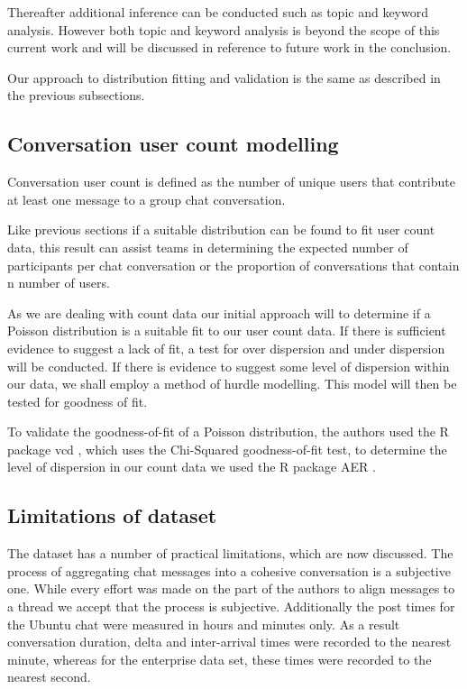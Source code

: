 \documentclass[conference]{IEEEtran}
\begin{document}
Thereafter additional inference can be conducted such as topic and keyword analysis. However both topic and keyword analysis is beyond the scope of this current work and will be discussed in reference to future work in the conclusion.

Our approach to distribution fitting and validation is the same as described in the previous subsections. 

\subsection{Conversation user count modelling}

Conversation user count is defined as the number of unique users that contribute at least one message to a group chat conversation. 

Like previous sections if a suitable distribution can be found to fit user count data, this result can assist teams in determining the expected number of participants per chat conversation or the proportion of conversations that contain n number of users.  

As we are dealing with count data our initial approach will to determine if a Poisson distribution is a suitable fit to our user count data. If there is sufficient evidence to suggest a lack of fit, a test for over dispersion and under dispersion will be conducted. If there is evidence to suggest some level of dispersion within our data, we shall employ a method of hurdle modelling. This model will then be tested for goodness of fit.

To validate the goodness-of-fit of a Poisson distribution, the authors used the R package vcd \cite{Rvcd}, which uses the Chi-Squared goodness-of-fit test, to determine the level of dispersion in our count data we used the R package AER \cite{RAER}.

\subsection{Limitations of dataset}

The dataset has a number of practical limitations, which are now discussed. The process of aggregating chat messages into a cohesive conversation is a subjective one. While every effort was made on the part of the authors to align messages to a thread we accept that the process is subjective. Additionally the post times for the Ubuntu chat were measured in hours and minutes only. As a result conversation duration, delta and inter-arrival times were recorded to the nearest minute, whereas for the enterprise data set, these times were recorded to the nearest second. \par
\end{document}
